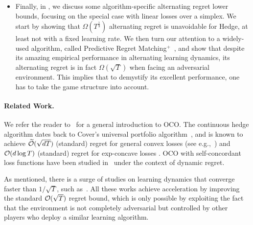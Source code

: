 \begin{itemize}[leftmargin=*]
    \item Finally, in , we discuss some algorithm-specific alternating regret lower bounds, focusing on the special case with linear losses over a simplex.
    We start by showing that $\Omega(T^{\frac{1}{3}})$ alternating regret is unavoidable for Hedge, at least not with a fixed learning rate.
    We then turn our attention to a widely-used algorithm, called Predictive Regret Matching$^+$~\citep{farina2021faster},
    and show that despite its amazing empirical performance in alternating learning dynamics, 
    its alternating regret is in fact $\Omega(\sqrt{T})$ when facing an adversarial environment.
    This implies that to demystify its excellent performance, one has to take the game structure into account.
\end{itemize}

\paragraph{Related Work.}
We refer the reader to~\citet{hazan2016introduction, orabona2019modern} for a general introduction to OCO.
The continuous hedge algorithm dates back to Cover's universal portfolio algorithm~\citep{cover1991universal}, and is known to achieve $\widetilde{\mathcal{O}}(\sqrt{dT})$ (standard) regret for general convex losses (see e.g.,~\citet{narayanan2010random}) and $\mathcal{O}(d\log T)$ (standard) regret for exp-concave losses \citep{hazan2007logarithmic}.
OCO with self-concordant loss functions have been studied in~\citet{zhang2017improved} under the context of dynamic regret.

As mentioned, there is a surge of studies on learning dynamics that converge faster than $1/\sqrt{T}$, such as~\citet{daskalakis2011near, rakhlin2013optimization, syrgkanis2015fast, chen2020hedging, daskalakis2021near-optimal, farina2022kernelized, anagnostides2022near-optimal, anagnostides2022uncoupled, farina2022near}.
All these works achieve acceleration by improving the standard $\mathcal{O}(\sqrt{T})$ regret bound, which is only possible by exploiting the fact that the environment is not completely adversarial but controlled by other players who deploy a similar learning algorithm.

